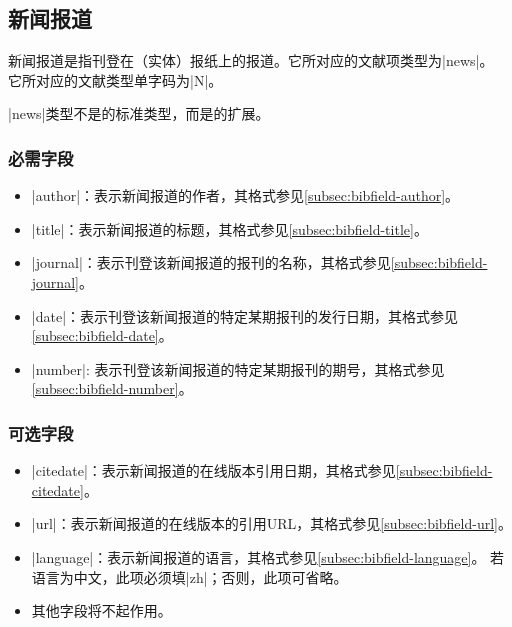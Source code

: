 

\subsection{新闻报道}\label{subsec:bibtype-news}

新闻报道是指刊登在（实体）报纸上的报道。它所对应的{\BibTeX}文献项类型为|news|。
它所对应的文献类型单字码为|N|\cite{gbt3469-1983}。

|news|类型不是{\BibTeX}的标准类型，而是{\njuthesis}的扩展。

\subsubsection{必需字段}

\begin{itemize}
\item |author|：表示新闻报道的作者，其格式参见\ref{subsec:bibfield-author}。
\item |title|：表示新闻报道的标题，其格式参见\ref{subsec:bibfield-title}。
\item |journal|：表示刊登该新闻报道的报刊的名称，其格式参见\ref{subsec:bibfield-journal}。
\item |date|：表示刊登该新闻报道的特定某期报刊的发行日期，其格式参见\ref{subsec:bibfield-date}。
\item |number|: 表示刊登该新闻报道的特定某期报刊的期号，其格式参见\ref{subsec:bibfield-number}。
\end{itemize}

\subsubsection{可选字段}

\begin{itemize}
\item |citedate|：表示新闻报道的在线版本引用日期，其格式参见\ref{subsec:bibfield-citedate}。
\item |url|：表示新闻报道的在线版本的引用URL，其格式参见\ref{subsec:bibfield-url}。
\item |language|：表示新闻报道的语言，其格式参见\ref{subsec:bibfield-language}。
  若语言为中文，此项必须填|zh|；否则，此项可省略。
\item 其他字段将不起作用。
\end{itemize}

